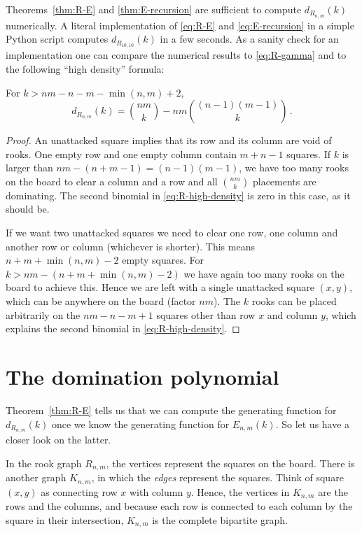 \documentclass[12pt,reqno]{article}
\begin{document}
Theorems~\ref{thm:R-E} and \ref{thm:E-recursion} are
sufficient to compute $d_{R_{n,m}}(k)$ numerically. A literal
implementation of \eqref{eq:R-E} and \eqref{eq:E-recursion} in a
simple Python script computes $d_{R_{10,10}}(k)$ in a few seconds.
As a sanity check for an implementation one can compare
the numerical results to \eqref{eq:R-gamma} and to
the following ``high density'' formula:
\begin{corollary} \label{cor:high-density}
  For $k > nm-n-m-\min(n,m)+2$,
\begin{equation}
  \label{eq:R-high-density}
  d_{R_{n,m}}(k) = {nm \choose k} - nm {(n-1)(m-1) \choose k}\,. 
\end{equation}
\end{corollary}
\begin{proof}
  An unattacked square implies that its row and its column are void of
  rooks. One empty row and one empty column contain $m+n-1$ squares.
  If $k$ is larger than $nm-(n+m-1)=(n-1)(m-1)$, we have too many rooks on the
  board to clear a column and a row and all ${nm \choose k}$
  placements are dominating. The second binomial in
  \eqref{eq:R-high-density} is zero in this case, as it should be.

  If we want two unattacked squares we need to clear one row, one
  column and another row or column (whichever is shorter). This means
  $n+m+\min(n,m)-2$ empty squares.  
  For $k > nm-(n+m+\min(n,m)-2) $ we have again too many rooks on the
  board to achieve this. Hence we are left with a single unattacked square
  $(x,y)$, which can be anywhere on the board (factor $nm$). The $k$ rooks
  can be placed arbitrarily on the $nm-n-m+1$ squares
  other than row $x$ and column $y$, which explains the second
  binomial in \eqref{eq:R-high-density}.
\end{proof}


\section{The domination polynomial}
\label{sec:domination_polynomial}

Theorem~\ref{thm:R-E} tells us that we can compute the generating
function for $d_{R_{n,m}}(k)$ once we know the generating function for
$E_{n,m}(k)$. So let us have a closer look on the latter.

In the rook graph $R_{n,m}$, the vertices represent the squares on the
board.  There is another graph $K_{n,m}$, in which the \emph{edges}
represent the squares. Think of square $(x,y)$ as connecting row $x$
with column $y$. Hence, the vertices in $K_{n,m}$ are the rows and the
columns, and because each row is connected to each column by the square
in their intersection, $K_{n,m}$ is the complete bipartite graph.
\end{document}
